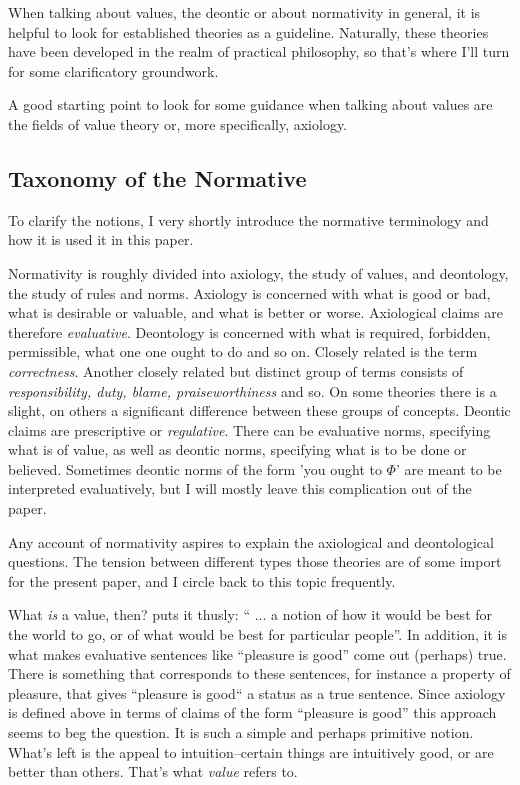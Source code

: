 \documentclass[12pt,numbers=noenddot]{scrartcl}
\begin{document}
When talking about values, the deontic or about normativity in general, it is helpful to look for established theories as a guideline. Naturally, these theories have been developed in the realm of practical philosophy, so that's where I'll turn for some clarificatory groundwork.

A good starting point to look for some guidance when talking about values are the fields of value theory or, more specifically, axiology.

\subsection{ Taxonomy of the Normative}

To clarify the notions, I very shortly introduce the normative terminology and how it is used it in this paper.

Normativity is roughly divided into axiology, the study of values, and deontology, the study of rules and norms. Axiology is concerned with what is good or bad, what is desirable or valuable, and what is better or worse. Axiological claims are therefore \emph{evaluative}. Deontology is concerned with what is required, forbidden, permissible, what one one ought to do and so on. Closely related is the term \emph{correctness}. Another closely related but distinct group of terms consists of \emph{responsibility, duty, blame, praiseworthiness} and so. On some theories there is a slight, on others a significant difference between these groups of concepts. Deontic claims are prescriptive or \emph{regulative}. There can be evaluative norms, specifying what is of value, as well as deontic norms, specifying what is to be done or believed. Sometimes deontic norms of the form 'you ought to $\Phi$' are meant to be interpreted evaluatively, but I will mostly leave this complication out of the paper.

Any account of normativity aspires to explain the axiological and deontological questions. The tension between different types those theories are of some import for the present paper, and I circle back to this topic frequently.

What \emph{is} a value, then? \textcite[79]{scanlon1998} puts it thusly: “ ... a notion of how it would be best for the world to go, or of what would be best for particular people”. In addition, it is what makes evaluative sentences like “pleasure is good” come out (perhaps) true. There is something that corresponds to these sentences, for instance a property of pleasure, that gives “pleasure is good“ a status as a true sentence. Since axiology is defined above in terms of claims of the form “pleasure is good” this approach seems to beg the question. It is such a simple and perhaps primitive notion. What's left is the appeal to intuition–certain things are intuitively good, or are better than others. That's what \emph{value} refers to.
\end{document}
